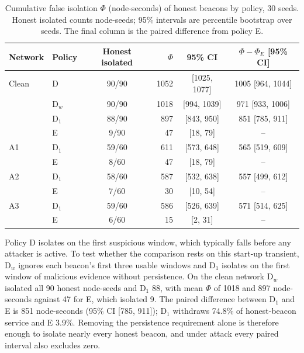 \documentclass[pdflatex,sn-mathphys-num]{sn-jnl}%
\theoremstyle{thmstyleone}%
\theoremstyle{thmstyletwo}%
\theoremstyle{thmstylethree}%
\begin{document}
\begin{table}[!t]
\caption{Cumulative false isolation $\Phi$ (node-seconds) of honest beacons by
policy, 30 seeds. Honest isolated counts node-seeds; 95\% intervals are
percentile bootstrap over seeds. The final column is the paired difference from
policy E.}
\label{tab:phivariants}
\centering
\footnotesize
\setlength{\tabcolsep}{4pt}
\begin{tabular}{@{}llcrcc@{}}
\toprule
Network & Policy & Honest isolated & $\Phi$ & 95\% CI & $\Phi - \Phi_E$ [95\% CI] \\
\midrule
Clean & D     & 90/90 & 1052 & [1025, 1077] & 1005 [964, 1044] \\
      & D$_w$ & 90/90 & 1018 & [994, 1039]  & 971 [933, 1006] \\
      & D$_1$ & 88/90 & 897  & [843, 950]   & 851 [785, 911] \\
      & E     & 9/90  & 47   & [18, 79]     & -- \\
A1    & D$_1$ & 59/60 & 611  & [573, 648]   & 565 [519, 609] \\
      & E     & 8/60  & 47   & [18, 79]     & -- \\
A2    & D$_1$ & 58/60 & 587  & [532, 638]   & 557 [499, 612] \\
      & E     & 7/60  & 30   & [10, 54]     & -- \\
A3    & D$_1$ & 59/60 & 586  & [526, 639]   & 571 [514, 625] \\
      & E     & 6/60  & 15   & [2, 31]      & -- \\
\bottomrule
\end{tabular}
\end{table}

Policy D isolates on the first suspicious window, which typically falls before
any attacker is active. To test whether the comparison rests on this start-up
transient, D$_w$ ignores each beacon's first three usable windows and D$_1$
isolates on the first window of malicious evidence without persistence. On the
clean network D$_w$ isolated all 90 honest node-seeds and D$_1$ 88, with mean
$\Phi$ of 1018 and 897 node-seconds against 47 for E, which isolated 9. The
paired difference between D$_1$ and E is 851 node-seconds (95\% CI
[785, 911]); D$_1$ withdraws 74.8\% of honest-beacon service and E 3.9\%.
Removing the persistence requirement alone is therefore enough to isolate
nearly every honest beacon, and under attack every paired interval also
excludes zero.
\end{document}
